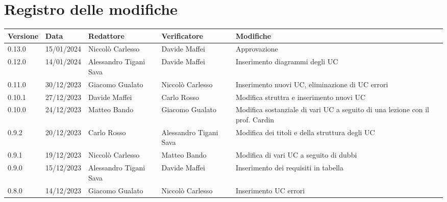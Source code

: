 \section*{Registro delle modifiche}


\begin{table}[H]
	\centering
	\fontsize{10}{12}\selectfont
	\begin{tabularx}{\textwidth}{X|X|X|X|X|X}
		\textbf{Versione}     & \textbf{Data}        & \textbf{Redattore}     &
		\textbf{Verificatore}  & \textbf{Modifiche}                                                                                                                    \\
		\toprule
		0.13.0	              & 15/01/2024            & Niccolò Carlesso           & Davide Maffei    	& Approvazione                                     \\
		\hline
		0.12.0	              & 14/01/2024            & Alessandro Tigani Sava & Davide Maffei      	& Inserimento diagrammi degli UC                                     \\
		\hline
		0.11.0	              & 30/12/2023            & Giacomo Gualato        & Niccolò Carlesso    & Inserimento nuovi UC, eliminazione di UC errori                                     \\
		\hline
		0.10.1	              & 27/12/2023           & Davide Maffei          & Carlo Rosso      		 & Modifica struttra e inserimento nuovi UC                                     \\
		\hline
		0.10.0	              & 24/12/2023           & Matteo Bando           & Giacomo Gualato    		 & Modifica sostanziale di vari UC a seguito di una lezione con il prof. Cardin                                     \\
		\hline
		0.9.2	              & 20/12/2023           & Carlo Rosso            & Alessandro Tigani Sava  		 & Modifica dei titoli e della struttura degli UC                                     \\
		\hline
		0.9.1	              & 19/12/2023           & Niccolò Carlesso       & Matteo Bando                & Modifica di vari UC a seguito di dubbi                                     \\
		\hline
		0.9.0                & 15/12/2023           & Alessandro Tigani Sava & Davide Maffei                & Inserimento dei requisiti in tabella                                     \\
		\hline
		0.8.0                & 14/12/2023           & Giacomo Gualato        & Niccolò Carlesso           	 & Inserimento UC errori                                     \\

\end{tabularx}
\end{table}
